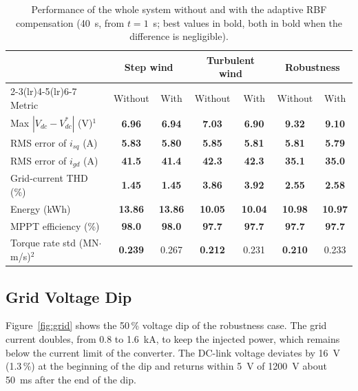 \documentclass[11pt,a4paper]{article}
\begin{document}
\begin{table}[!htb]
\caption{Performance of the whole system without and with the adaptive RBF compensation (40~s, from
$t=1$~s; best values in bold, both in bold when the difference is negligible).}
\label{tab:sys}
\centering
\small
\setlength{\tabcolsep}{4.5pt}
\begin{tabular}{lcccccc}
\toprule
 & \multicolumn{2}{c}{Step wind} & \multicolumn{2}{c}{Turbulent wind} & \multicolumn{2}{c}{Robustness}\\
\cmidrule(lr){2-3}\cmidrule(lr){4-5}\cmidrule(lr){6-7}
Metric & Without & With & Without & With & Without & With\\
\midrule
Max $|V_{dc}-V_{dc}^*|$ (V)$^{1}$ & \textbf{6.96} & \textbf{6.94} & \textbf{7.03} & \textbf{6.90} & \textbf{9.32} & \textbf{9.10}\\
RMS error of $i_{sq}$ (A) & \textbf{5.83} & \textbf{5.80} & \textbf{5.85} & \textbf{5.81} & \textbf{5.81} & \textbf{5.79}\\
RMS error of $i_{gd}$ (A) & \textbf{41.5} & \textbf{41.4} & \textbf{42.3} & \textbf{42.3} & \textbf{35.1} & \textbf{35.0}\\
Grid-current THD (\%) & \textbf{1.45} & \textbf{1.45} & \textbf{3.86} & \textbf{3.92} & \textbf{2.55} & \textbf{2.58}\\
Energy (kWh) & \textbf{13.86} & \textbf{13.86} & \textbf{10.05} & \textbf{10.04} & \textbf{10.98} & \textbf{10.97}\\
MPPT efficiency (\%) & \textbf{98.0} & \textbf{98.0} & \textbf{97.7} & \textbf{97.7} & \textbf{97.7} & \textbf{97.7}\\
Torque rate std (MN$\cdot$m/s)$^{2}$ & \textbf{0.239} & 0.267 & \textbf{0.212} & 0.231 & \textbf{0.210} & 0.233\\
\bottomrule
\end{tabular}

\end{table}

\subsection{Grid Voltage Dip}
Figure~\ref{fig:grid} shows the 50\,\% voltage dip of the robustness case. The grid current doubles, from
0.8 to 1.6~kA, to keep the injected power, which remains below the current limit of the converter. The
DC-link voltage deviates by 16~V (1.3\,\%) at the beginning of the dip and returns within 5~V of 1200~V
about 50~ms after the end of the dip.
\end{document}
